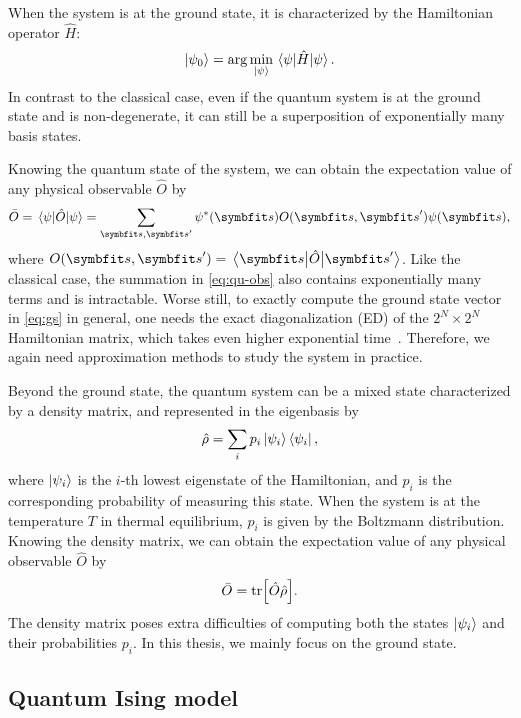 When the system is at the ground state, it is characterized by the Hamiltonian operator $\hat{H}$:
\begin{equation}
\ket{\psi_0} = \arg\min_{\ket{\psi}} \mel{\psi}{\hat{H}}{\psi}.
\label{eq:gs}
\end{equation}
In contrast to the classical case, even if the quantum system is at the ground state and is non-degenerate, it can still be a superposition of exponentially many basis states.

Knowing the quantum state of the system, we can obtain the expectation value of any physical observable $\hat{O}$ by
\begin{equation}
\bar{O} = \mel{\psi}{\hat{O}}{\psi} = \sum_{\vs, \vs'} \psi^*(\vs) O(\vs, \vs') \psi(\vs),
\label{eq:qu-obs}
\end{equation}
where $O(\vs, \vs') = \mel{\vs}{\hat{O}}{\vs'}$. Like the classical case, the summation in \cref{eq:qu-obs} also contains exponentially many terms and is intractable. Worse still, to exactly compute the ground state vector in \cref{eq:gs} in general, one needs the exact diagonalization (ED) of the $2^N \times 2^N$ Hamiltonian matrix, which takes even higher exponential time~\cite{weisse2008exact}. Therefore, we again need approximation methods to study the system in practice.

Beyond the ground state, the quantum system can be a mixed state characterized by a density matrix, and represented in the eigenbasis by
\begin{equation}
\hat{\rho} = \sum_i p_i \ket{\psi_i}\bra{\psi_i},
\end{equation}
where $\ket{\psi_i}$ is the $i$-th lowest eigenstate of the Hamiltonian, and $p_i$ is the corresponding probability of measuring this state. When the system is at the temperature $T$ in thermal equilibrium, $p_i$ is given by the Boltzmann distribution. Knowing the density matrix, we can obtain the expectation value of any physical observable $\hat{O}$ by
\begin{equation}
\bar{O} = \tr[\hat{O} \hat{\rho}].
\label{eq:dm-obs}
\end{equation}
The density matrix poses extra difficulties of computing both the states $\ket{\psi_i}$ and their probabilities $p_i$. In this thesis, we mainly focus on the ground state.

\subsection{Quantum Ising model}

